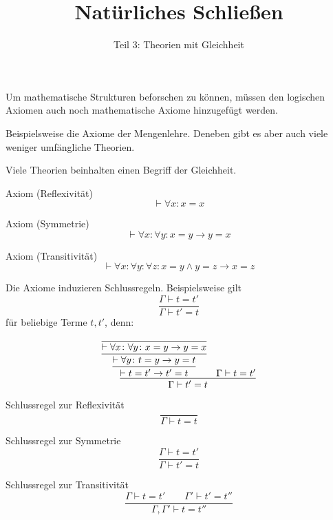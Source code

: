 \documentclass[8pt]{beamer}
\title{Natürliches Schließen}
\subtitle{Teil 3: Theorien mit Gleichheit}
\date{}
\newcommand{\parspace}{\vspace{0.8em}}
\newcommand{\cond}{\rightarrow}
\begin{document}
\begin{frame}
\maketitle
\end{frame}

\begin{frame}
Um mathematische Strukturen beforschen zu können, müssen den
logischen Axiomen auch noch mathematische Axiome hinzugefügt
werden.

\parspace
Beispielsweise die Axiome der Mengenlehre. Deneben gibt es aber auch
viele weniger umfängliche Theorien.

\parspace
Viele Theorien beinhalten einen Begriff der Gleichheit.
\end{frame}

\begin{frame}
\begin{block}{Axiom (Reflexivität)}
\[\vdash\forall x\colon x=x\]
\end{block}\pause

\begin{block}{Axiom (Symmetrie)}
\[\vdash\forall x\colon\forall y\colon x=y\cond y=x\]
\end{block}\pause

\begin{block}{Axiom (Transitivität)}
\[\vdash\forall x\colon\forall y\colon\forall z\colon x=y\land y=z\cond x=z\]
\end{block}
\end{frame}

\begin{frame}
Die Axiome induzieren Schlussregeln. Beispielsweise gilt
\[\dfrac{\Gamma\vdash t=t'}{\Gamma\vdash t'=t}\]
für beliebige Terme $t,t'$, denn:

\[
\infer{\Gamma\vdash t'=t}{
  \infer{\vdash t=t'\cond t'=t}{
    \infer{\vdash\forall y\colon t=y\cond y=t}{
      \infer{\vdash\forall x\colon\forall y\colon x=y\cond y=x}{}}}
& \Gamma\vdash t=t'}
\]
\end{frame}

\begin{frame}
\begin{block}{Schlussregel zur Reflexivität}
\[\dfrac{}{\Gamma\vdash t=t}\]
\end{block}\pause

\begin{block}{Schlussregel zur Symmetrie}
\[\dfrac{\Gamma\vdash t=t'}{\Gamma\vdash t'=t}\]
\end{block}\pause

\begin{block}{Schlussregel zur Transitivität}
\[\dfrac{\Gamma\vdash t=t'\qquad\Gamma'\vdash t'=t''}{\Gamma,\Gamma'\vdash t=t''}\]
\end{block}
\end{frame}
\end{document}
